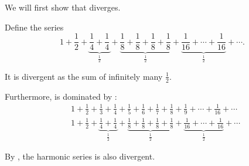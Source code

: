 \begin{RefListProof}
     We will first show that  diverges.

    Define the series
    \begin{equation}\label{def:harmonic_progression/powers_of_two}
      1 + \frac 1 2 + \underbrace{\frac 1 4 + \frac 1 4}_{\tfrac 1 2} + \underbrace{\frac 1 8 + \frac 1 8 + \frac 1 8 + \frac 1 8}_{\tfrac 1 2} + \underbrace{\frac 1 {16} + \cdots + \frac 1 {16}}_{\tfrac 1 2} + \cdots.
    \end{equation}

    It is divergent as the sum of infinitely many \( \frac 1 2 \).

    Furthermore,  is dominated by :
    \begin{align*}
      &1 + \frac 1 2 + \frac 1 3 + \frac 1 4 + \frac 1 5 + \frac 1 6 + \frac 1 7 + \frac 1 8 + \frac 1 9 + \cdots + \frac 1 {16} + \cdots
      \\
      &1 + \frac 1 2 + \underbrace{\frac 1 4 + \frac 1 4}_{\tfrac 1 2} + \underbrace{\frac 1 8 + \frac 1 8 + \frac 1 8 + \frac 1 8}_{\tfrac 1 2} + \underbrace{\frac 1 {16} + \cdots + \frac 1 {16}}_{\tfrac 1 2} + \cdots
    \end{align*}

    By , the harmonic series  is also divergent.
\end{RefListProof}
